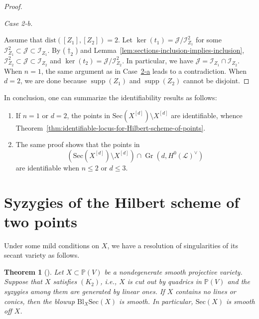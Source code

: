 \documentclass[a4paper]{amsart}
\numberwithin{equation}{section}
\theoremstyle{plain}
\newtheorem{thm}{Theorem}[section]
\theoremstyle{definition}
\theoremstyle{remark}
\numberwithin{figure}{section}
\numberwithin{table}{section}
\numberwithin{equation}{section}
\def \PP {\mathbb{P}}
\def \Ical {\mathcal{I}}
\def \Jcal {\mathcal{J}}
\def \Lcal {\mathcal{L}}
\DeclareMathOperator{\supp}{supp}
\DeclareMathOperator{\Gr}{Gr}
\begin{document}
\begin{proof}
\hypertarget{Case3-2-b}{\textit{Case 2-b.}} Assume that $\mathrm{dist}([Z_1], [Z_2]) = 2$.
Let $\ker(t_1) = \Jcal/\Ical_{Z_1}^2$ for some $\Ical_{Z_1}^2 \subset \Jcal \subset \Ical_{Z_1}$.
By (\hyperlink{dagger2}{$\dagger_2$}) and Lemma~\ref{lem:sections-inclusion-implies-inclusion}, $\Ical_{Z_2}^2 \subset \Jcal \subset \Ical_{Z_2}$ and $\ker(t_2) = \Jcal/\Ical_{Z_2}^2$.
In particular, we have $\Jcal = \Ical_{Z_1} \cap \Ical_{Z_2}$.
When $n = 1$, the same argument as in Case~\hyperlink{Case3-2-a}{2-a} leads to a contradiction.
When $d = 2$, we are done because $\supp(Z_1)$ and $\supp(Z_2)$ cannot be disjoint.
\end{proof}

In conclusion, one can summarize the identifiability results as follows:
\begin{enumerate}
    \item If $n = 1$ or $d = 2$, the points in $\mathrm{Sec}(X^{[d]}) \setminus X^{[d]}$ are identifiable, whence Theorem~\ref{thm:identifiable-locus-for-Hilbert-scheme-of-points}.
    \item The same proof shows that the points in
     \[
      (\mathrm{Sec}(X^{[d]}) \setminus X^{[d]}) \cap \Gr(d,H^0(\Lcal)^{\vee})
     \]
    are identifiable when $n \leq 2$ or $d \leq 3$.
\end{enumerate}



\section{Syzygies of the Hilbert scheme of two points} \label{sec:syzygies}

Under some mild conditions on $X$, we have a resolution of singularities of its secant variety as follows.

\begin{thm}[{\cite[Theorem~3.9]{Vermeire2001}}] \label{thm:Singularity-of-secant-variety}
    Let $X \subset \PP(V)$ be a nondegenerate smooth projective variety.
    Suppose that $X$ satisfies $(K_2)$, i.e., $X$ is cut out by quadrics in $\PP(V)$ and the syzygies among them are generated by linear ones.
    If $X$ contains no lines or conics, then the blowup $\mathrm{Bl}_X \mathrm{Sec}(X)$ is smooth.
    In particular, $\mathrm{Sec}(X)$ is smooth off $X$.
\end{thm}
\end{document}
